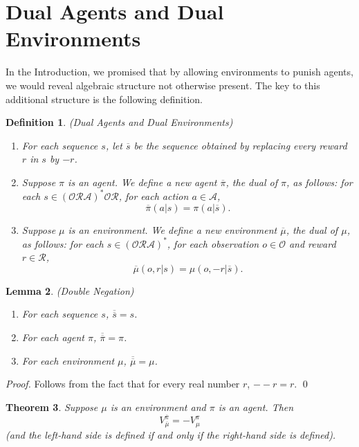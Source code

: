 \documentclass[runningheads]{llncs}
\newtheorem{mytheorem}{Theorem}
\newtheorem{mydefinition}[mytheorem]{Definition}
\newtheorem{mylemma}[mytheorem]{Lemma}
\begin{document}
\section{Dual Agents and Dual Environments}
\label{dualsection}

In the Introduction, we promised that by allowing environments to punish agents,
we would reveal algebraic structure not otherwise present. The key to this additional
structure is the following definition.

\begin{mydefinition}
(Dual Agents and Dual Environments)
\begin{enumerate}
    \item
    For each sequence $s$, let $\overline s$ be the sequence obtained
    by replacing every reward $r$ in $s$ by $-r$.
    \item
    Suppose $\pi$ is an agent.
    We define a new agent $\overline \pi$, the \emph{dual} of $\pi$,
    as follows:
    for each $s\in (\mathcal O\mathcal R\mathcal A)^*\mathcal O\mathcal R$,
    for each action $a\in\mathcal A$,
    \[\overline\pi(a|s)=\pi(a|\overline s).\]
    \item
    Suppose $\mu$ is an environment.
    We define a new environment $\overline\mu$, the \emph{dual} of $\mu$,
    as follows:
    for each $s\in (\mathcal O\mathcal R\mathcal A)^*$,
    for each observation $o\in\mathcal O$
    and reward $r\in\mathcal R$,
    \[\overline\mu(o,r|s)=\mu(o,-r|\overline s).\]
\end{enumerate}
\end{mydefinition}

\begin{mylemma}
\label{doublesubtractionlemma}
(Double Negation)
    \begin{enumerate}
        \item For each sequence $s$, $\overline{\overline s}=s$.
        \item For each agent $\pi$, $\overline{\overline \pi}=\pi$.
        \item For each environment $\mu$, $\overline{\overline \mu}=\mu$.
    \end{enumerate}
\end{mylemma}

\begin{proof}
    Follows from the fact that for every real number $r$, $--r=r$.
    \qed
\end{proof}

\begin{mytheorem}
\label{bigtheorem}
    Suppose $\mu$ is an environment and $\pi$ is an agent.
    Then
    \[
        V^{\overline \pi}_{\overline \mu}=-V^\pi_\mu
    \]
    (and the left-hand side is defined if and only if the right-hand side is defined).
\end{mytheorem}
\end{document}
